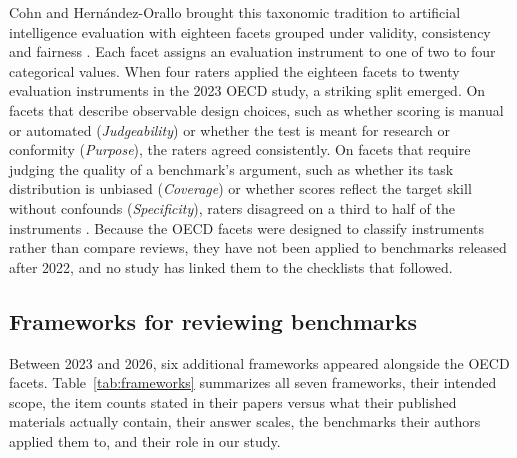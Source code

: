 \documentclass[10pt,conference]{IEEEtran}
\begin{document}
Cohn and Hern\'andez-Orallo brought this taxonomic tradition to artificial intelligence evaluation with eighteen facets grouped under validity, consistency and fairness \cite{cohn_categorising_2022,cohn_hernandez_orallo_oecd_2023}. Each facet assigns an evaluation instrument to one of two to four categorical values. When four raters applied the eighteen facets to twenty evaluation instruments in the 2023 OECD study, a striking split emerged. On facets that describe observable design choices, such as whether scoring is manual or automated (\emph{Judgeability}) or whether the test is meant for research or conformity (\emph{Purpose}), the raters agreed consistently. On facets that require judging the quality of a benchmark's argument, such as whether its task distribution is unbiased (\emph{Coverage}) or whether scores reflect the target skill without confounds (\emph{Specificity}), raters disagreed on a third to half of the instruments \cite{cohn_hernandez_orallo_oecd_2023}. Because the OECD facets were designed to classify instruments rather than compare reviews, they have not been applied to benchmarks released after 2022, and no study has linked them to the checklists that followed.

\subsection{Frameworks for reviewing benchmarks}
Between 2023 and 2026, six additional frameworks appeared alongside the OECD facets. Table~\ref{tab:frameworks} summarizes all seven frameworks, their intended scope, the item counts stated in their papers versus what their published materials actually contain, their answer scales, the benchmarks their authors applied them to, and their role in our study.
\end{document}
